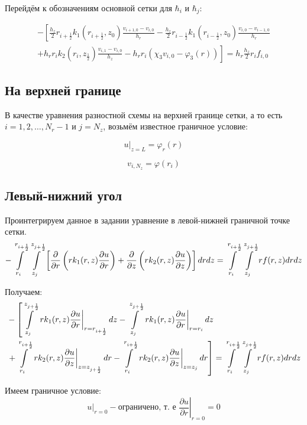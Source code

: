 Перейдём к обозначениям основной сетки для $ \hbar_i $ и $ \hbar_j $:

\begin{align*}
  - \left [ 
  \frac{h_z}{2} r_{i+\frac{1}{2}} k_1(r_{i+\frac{1}{2}}, z_0) \frac{v_{i+1, 0} - v_{i, 0}}{h_{r}}
  - \frac{h_z}{2} r_{i-\frac{1}{2}} k_1(r_{i-\frac{1}{2}}, z_0) \frac{v_{i, 0} - v_{i - 1, 0}}{h_{r}}
  \right . \\
  \left .
  + h_r r_{i} k_2(r_i, z_{\frac{1}{2}}) \frac{v_{i, 1} - v_{i, 0}}{h_{z}}
  - h_r r_i (\chi_3 v_{i, 0} - \varphi_3(r))
  \right ]  = h_r \frac{h_z}{2} r_i f_{i, 0}
\end{align*}

\subsection{На верхней границе}
В качестве уравнения разностной схемы на верхней границе сетки, 
а то есть $ i = 1, 2, \dots, N_r - 1 $ и $ j = N_z $, возьмём известное граничное условие:

\[
  \left . u \right \vert_{z=L} = \varphi_r(r) 
\]

\[
  v_{i,N_z} = \varphi(r_i)
\]

\subsection{Левый-нижний угол}

Проинтегрируем данное в задании уравнение в левой-нижней граничной точке сетки.
\[
  - \int\limits^{r_{i +\frac{1}{2}}}_{r_{i }} \int\limits^{z_{j +\frac{1}{2}}}_{z_{j }} \left [ \pdv{}{r} \left ( r k_1(r, z) \pdv{u}{r} \right ) 
  + \pdv{}{z} \left ( rk_2(r, z)\pdv{u}{z} \right ) \right ] dr dz = \int\limits^{r_{i +\frac{1}{2}}}_{r_{i }} \int\limits^{z_{j +\frac{1}{2}}}_{z_{j }} rf(r, z) dr dz
\]

Получаем:
\begin{align*}
  &- \left [
   \int\limits^{z_{j +\frac{1}{2}}}_{z_{j }}  \left . r k_1(r, z) \pdv{u}{r} \right \vert_{r = r_{i + \frac{1}{2}}} dz
  - \int\limits^{z_{j +\frac{1}{2}}}_{z_{j }} \left . r k_1(r, z) \pdv{u}{r} \right \vert_{r = r_{i}} dz
  \right . \\
  &\left . + \int\limits^{r_{i+\frac{1}{2}}}_{r_{i}} \left . rk_2(r, z)\pdv{u}{z} \right \vert_{z = z_{j + \frac{1}{2}}} dr
  - \int\limits^{r_{i+\frac{1}{2}}}_{r_{i}} \left . rk_2(r, z)\pdv{u}{z} \right \vert_{z = z_{j}} dr
  \right ] = \int\limits^{r_{i +\frac{1}{2}}}_{r_{i }} \int\limits^{z_{j +\frac{1}{2}}}_{z_{j }} rf(r, z) dr dz
\end{align*}

Имеем граничное условие:
\[
  \left . u \right \vert_{r=0} - \text{ограничено, т. е } \left . \frac{\partial u}{ \partial r} \right |_{r = 0} = 0
\]

